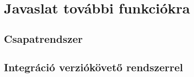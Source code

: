\chapter{Javaslat további funkciókra}\label{chapter:features}

\section{Csapatrendszer}

\section{Integráció verziókövető rendszerrel}
